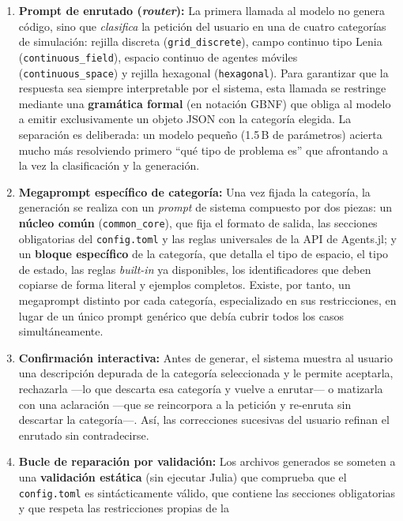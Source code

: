 \documentclass[runningheads]{llncs}
\begin{document}
\begin{enumerate}
    \item \textbf{Prompt de enrutado (\textit{router}):} La primera llamada al
    modelo no genera código, sino que \textit{clasifica} la petición del usuario
    en una de cuatro categorías de simulación: rejilla discreta
    (\texttt{grid\_discrete}), campo continuo tipo Lenia
    (\texttt{continuous\_field}), espacio continuo de agentes móviles
    (\texttt{continuous\_space}) y rejilla hexagonal (\texttt{hexagonal}). Para
    garantizar que la respuesta sea siempre interpretable por el sistema, esta
    llamada se restringe mediante una \textbf{gramática formal} (en notación
    GBNF) que obliga al modelo a emitir exclusivamente un objeto JSON con la
    categoría elegida. La separación es deliberada: un modelo pequeño
    (1.5\,B de parámetros) acierta mucho más resolviendo primero ``qué tipo de
    problema es'' que afrontando a la vez la clasificación y la generación.
    \item \textbf{Megaprompt específico de categoría:} Una vez fijada la
    categoría, la generación se realiza con un \textit{prompt} de sistema
    compuesto por dos piezas: un \textbf{núcleo común} (\texttt{common\_core}),
    que fija el formato de salida, las secciones obligatorias del
    \texttt{config.toml} y las reglas universales de la API de Agents.jl; y un
    \textbf{bloque específico} de la categoría, que detalla el tipo de espacio,
    el tipo de estado, las reglas \textit{built-in} ya disponibles, los
    identificadores que deben copiarse de forma literal y ejemplos completos.
    Existe, por tanto, un megaprompt distinto por cada categoría, especializado
    en sus restricciones, en lugar de un único prompt genérico que debía cubrir
    todos los casos simultáneamente.
    \item \textbf{Confirmación interactiva:} Antes de generar, el sistema muestra
    al usuario una descripción depurada de la categoría seleccionada y le permite
    aceptarla, rechazarla —lo que descarta esa categoría y vuelve a enrutar— o
    matizarla con una aclaración —que se reincorpora a la petición y re-enruta
    sin descartar la categoría—. Así, las correcciones sucesivas del usuario
    refinan el enrutado sin contradecirse.
    \item \textbf{Bucle de reparación por validación:} Los archivos generados se
    someten a una \textbf{validación estática} (sin ejecutar Julia) que comprueba
    que el \texttt{config.toml} es sintácticamente válido, que contiene las
    secciones obligatorias y que respeta las restricciones propias de la

\end{enumerate}
\end{document}
